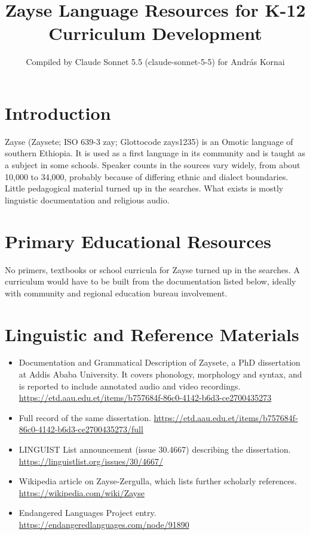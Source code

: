 \documentclass[12pt]{article}
\title{Zayse Language Resources for K-12 Curriculum Development}
\author{Compiled by Claude Sonnet 5.5 (claude-sonnet-5-5) for Andr\'as Kornai}
\date{}
\begin{document}
\maketitle

\section{Introduction}
Zayse (Zaysete; ISO 639-3 zay; Glottocode zays1235) is an Omotic language of southern Ethiopia. It is used as a first language in its community and is taught as a subject in some schools. Speaker counts in the sources vary widely, from about 10,000 to 34,000, probably because of differing ethnic and dialect boundaries. Little pedagogical material turned up in the searches. What exists is mostly linguistic documentation and religious audio.

\section{Primary Educational Resources}
No primers, textbooks or school curricula for Zayse turned up in the searches. A curriculum would have to be built from the documentation listed below, ideally with community and regional education bureau involvement.

\section{Linguistic and Reference Materials}
\begin{itemize}
\item Documentation and Grammatical Description of Zaysete, a PhD dissertation at Addis Ababa University. It covers phonology, morphology and syntax, and is reported to include annotated audio and video recordings. \url{https://etd.aau.edu.et/items/b757684f-86c0-4142-b6d3-ce2700435273}
\item Full record of the same dissertation. \url{https://etd.aau.edu.et/items/b757684f-86c0-4142-b6d3-ce2700435273/full}
\item LINGUIST List announcement (issue 30.4667) describing the dissertation. \url{https://linguistlist.org/issues/30/4667/}
\item Wikipedia article on Zayse-Zergulla, which lists further scholarly references. \url{https://wikipedia.com/wiki/Zayse}
\item Endangered Languages Project entry. \url{https://endangeredlanguages.com/node/91890}
\end{itemize}
\end{document}
